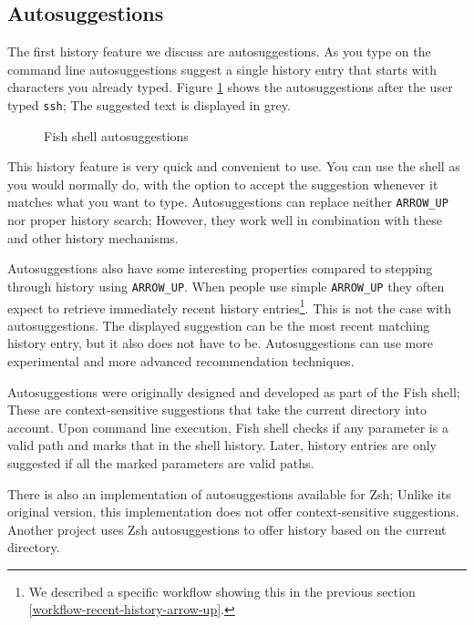 \subsection{Autosuggestions}

The first history feature we discuss are autosuggestions. As you type on the command line autosuggestions suggest a single history entry that starts with characters you already typed. Figure \ref{fish-autosuggestions} shows the autosuggestions after the user typed \verb|ssh|; The suggested text is displayed in grey.


\begin{figure}[h!]
  \caption{Fish shell autosuggestions}
  \label{fish-autosuggestions}
\end{figure}


This history feature is very quick and convenient to use. You can use the shell as you would normally do, with the option to accept the suggestion whenever it matches what you want to type. Autosuggestions can replace neither \verb|ARROW_UP| nor proper history search; However, they work well in combination with these and other history mechanisms.

Autosuggestions also have some interesting properties compared to stepping through history using \verb|ARROW_UP|.
When people use simple \verb|ARROW_UP| they often expect to retrieve immediately recent history entries\footnote{We described a specific workflow showing this in the previous section \ref{workflow-recent-history-arrow-up}.}. This is not the case with autosuggestions. The displayed suggestion can be the most recent matching history entry, but it also does not have to be. Autosuggestions can use more experimental and more advanced recommendation techniques.

Autosuggestions were originally designed and developed as part of the Fish\cite{fishdocs} shell; These are context-sensitive suggestions that take the current directory into account. Upon command line execution, Fish shell checks if any parameter is a valid path and marks that in the shell history. Later, history entries are only suggested if all the marked parameters are valid paths\cite{toolsfishissueautosuggestions}.

There is also an implementation of autosuggestions available for Zsh\cite{toolszshautosuggestions}; Unlike its original version, this implementation does not offer context-sensitive suggestions. Another project\cite{toolszshhistdb} uses Zsh autosuggestions to offer history based on the current directory.

